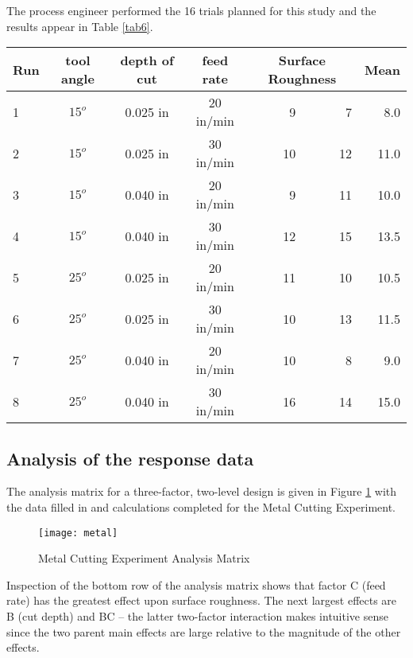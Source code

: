 The process engineer performed the 16 trials planned for this study and the results appear in Table \ref{tab6}.
\begin{sidewaystable}[h]\caption{Metal Cutting Experiment Data Table}\label{tab6}
\begin{center}
\begin{tabular}{|l|c|c|c|r|r|r|}
\hline Run & \textbf{tool angle} & \textbf{depth of cut} & \textbf{feed rate} & \multicolumn{2}{c|}{\textbf{Surface Roughness}} & \textbf{Mean}\\ 
\hline 1 & $15^{o}$ & 0.025 in & 20 in/min &  9 &  7 &  8.0\\ 
\hline 2 & $15^{o}$ & 0.025 in & 30 in/min & 10 & 12 & 11.0\\ 
\hline 3 & $15^{o}$ & 0.040 in & 20 in/min &  9 & 11 & 10.0\\ 
\hline 4 & $15^{o}$ & 0.040 in & 30 in/min & 12 & 15 & 13.5\\
\hline 5 & $25^{o}$ & 0.025 in & 20 in/min & 11 & 10 & 10.5\\
\hline 6 & $25^{o}$ & 0.025 in & 30 in/min & 10 & 13 & 11.5\\
\hline 7 & $25^{o}$ & 0.040 in & 20 in/min & 10 &  8 &  9.0\\
\hline 8 & $25^{o}$ & 0.040 in & 30 in/min & 16 & 14 & 15.0\\ 
\hline 

\end{tabular} 
\end{center}
\end{sidewaystable}
\subsection{Analysis of the response data}
The analysis matrix for a three-factor, two-level design is given in Figure \ref{fig5}  with the data filled in and calculations completed for the Metal Cutting Experiment.
\begin{figure}[h]\caption{Metal Cutting Experiment Analysis Matrix}\label{fig5}
\begin{center}
\texttt{[image: metal]}
\end{center}
\end{figure}
Inspection of the bottom row of the analysis matrix shows that factor C (feed rate) has the greatest effect upon surface roughness. The next largest effects are B (cut depth) and BC -- the latter two-factor interaction makes intuitive sense since the two parent main effects are large relative to the magnitude of the other effects.

